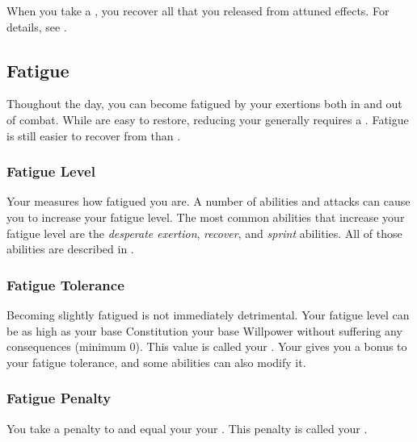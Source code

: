         When you take a , you recover all  that you released from attuned effects.
        For details, see .

    \subsection{Fatigue}\label{Fatigue}
        Thoughout the day, you can become fatigued by your exertions both in and out of combat.
        While  are easy to restore, reducing your  generally requires a .
        Fatigue is still easier to recover from than .

        \subsubsection{Fatigue Level}\label{Fatigue Level}
            Your  measures how fatigued you are.
            A number of abilities and attacks can cause you to increase your fatigue level.
            The most common abilities that increase your fatigue level are the \textit{desperate exertion}, \textit{recover}, and \textit{sprint} abilities.
            All of those abilities are described in .

            \subsubsection{Fatigue Tolerance}\label{Fatigue Tolerance}
                Becoming slightly fatigued is not immediately detrimental.
                Your fatigue level can be as high as your base Constitution \add your base Willpower without suffering any consequences (minimum 0).
                This value is called your .
                Your  gives you a bonus to your fatigue tolerance, and some abilities can also modify it.

            \subsubsection{Fatigue Penalty}\label{Fatigue Penalty}
                You take a penalty to  and  equal your  \sub your .
                This penalty is called your .

